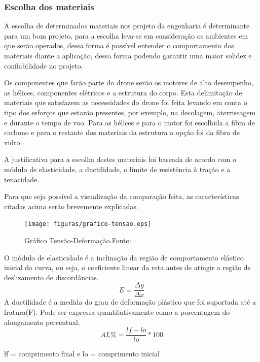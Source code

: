 \subsubsection{Escolha dos materiais}

A escolha de determinados materiais nos projeto da engenharia é determinante para um bom projeto, para a escolha leva-se em  consideração 
os ambientes em que serão operados, dessa forma é possível entender o comportamento dos materiais diante a aplicação, dessa forma podendo 
garantir uma maior solidez e confiabilidade no projeto.

Os componentes que farão parte do drone serão os motores de alto desempenho, as hélices, componentes elétricos e a estrutura do corpo. 
Esta delimitação de materiais que satisfazem as necessidades do drone foi feita levando  em conta o tipo dos esforços que estarão  presentes,  
por exemplo, na decolagem, aterrissagem  e durante o tempo  de voo. Para as hélices e para  o motor foi escolhida  a fibra de carbono  e
para  o restante dos materiais da estrutura a opção foi da fibra de vidro.

A justificativa para a escolha destes materiais foi baseada de acordo com o módulo de elasticidade, a ductilidade, o limite de
resistência à tração e a tenacidade. 

Para que seja possível a visualização da comparação feita, as características citadas acima serão brevemente explicadas.


\begin{figure}[H]
    \centering
      \texttt{[image: figuras/grafico-tensao.eps]}
    \caption{Gráfico Tensão-Deformação.Fonte: \cite{callister}}
    \label{fig:grafico-tensao}
\end{figure}

O módulo de elasticidade é a inclinação da região de comportamento elástico inicial da curva, ou seja, o coeficiente linear da reta antes de atingir a região de deslizamento de discordâncias.
\begin{equation}
E =\frac{\Delta y}{\Delta x}
\end{equation}
A ductilidade é a medida do grau de deformação plástico que foi suportada até a fratura(F). Pode ser expressa quantitativamente como a porcentagem do alongamento percentual.
\begin{equation}
AL\% =\frac{lf - lo}{lo} * 100
\end{equation}
\begin{center}
lf = comprimento final e lo = comprimento inicial
\end{center}

